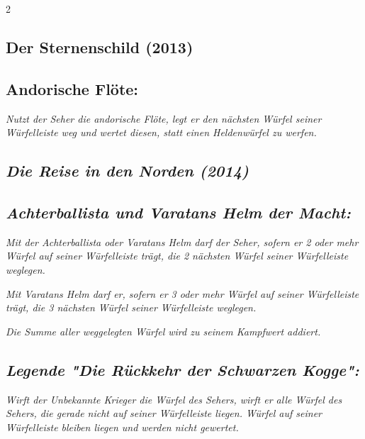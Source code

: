 \documentclass[10pt, a4paper, oneside]{book}
\newcommand{\fan}[1]{\textit{#1}}
\begin{document}
\begin{multicols*}{2}
\begin{bgcolor}
\end{bgcolor}



\begin{bgcolor}
\section{Der Sternenschild (2013)}

\subsection{Andorische Flöte:}

\fan{Nutzt der Seher die andorische Flöte, legt er den nächsten Würfel seiner Würfelleiste weg und wertet diesen, statt einen Heldenwürfel zu werfen.}


\end{bgcolor}






\begin{bgcolor}
\section{\fan{Die Reise in den Norden (2014)}}



\subsection{\fan{Achterballista und Varatans Helm der Macht:}}

\fan{Mit der Achterballista oder Varatans Helm darf der Seher, sofern er 2 oder mehr Würfel auf seiner Würfelleiste trägt, die 2 nächsten Würfel seiner Würfelleiste weglegen.}

\fan{Mit Varatans Helm darf er, sofern er 3 oder mehr Würfel auf seiner Würfelleiste trägt, die 3 nächsten Würfel seiner Würfelleiste weglegen.}

\fan{Die Summe aller weggelegten Würfel wird zu seinem Kampfwert addiert.}


\subsection{\fan{Legende "Die Rückkehr der Schwarzen Kogge":}}

\fan{Wirft der Unbekannte Krieger die Würfel des Sehers, wirft er alle Würfel des Sehers, die gerade nicht auf seiner Würfelleiste liegen. Würfel auf seiner Würfelleiste bleiben liegen und werden nicht gewertet.}




\end{bgcolor}
\end{multicols*}
\end{document}
